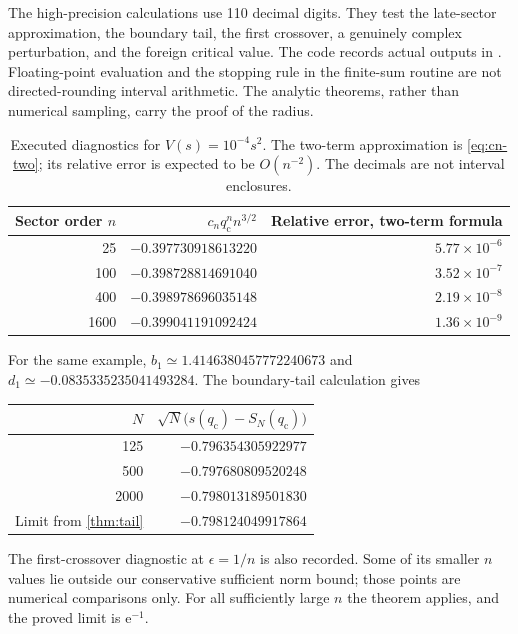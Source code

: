 \documentclass[11pt,a4paper]{article}
\numberwithin{equation}{section}
\theoremstyle{definition}
\theoremstyle{remark}
\newcommand{\e}{\mathrm e}
\newcommand{\qcv}{q_{\mathrm c}}
\begin{document}
The high-precision calculations use 110 decimal digits. They test the late-sector approximation, the boundary tail, the first crossover, a genuinely complex perturbation, and the foreign critical value. The code records actual outputs in . Floating-point evaluation and the stopping rule in the finite-sum routine are not directed-rounding interval arithmetic. The analytic theorems, rather than numerical sampling, carry the proof of the radius.

\begin{table}[htbp]
\centering\small
\begin{tabular}{r rr}
\toprule
Sector order $n$ & $c_n\qcv^n n^{3/2}$ & Relative error, two-term formula\\
\midrule
25   & $-0.397730918613220$ & $5.77\times10^{-6}$\\
100  & $-0.398728814691040$ & $3.52\times10^{-7}$\\
400  & $-0.398978696035148$ & $2.19\times10^{-8}$\\
1600 & $-0.399041191092424$ & $1.36\times10^{-9}$\\
\bottomrule
\end{tabular}
\caption{Executed diagnostics for $V(s)=10^{-4}s^2$. The two-term approximation is \eqref{eq:cn-two}; its relative error is expected to be $O(n^{-2})$. The decimals are not interval enclosures.}
\label{tab:late}
\end{table}

For the same example, $b_1\simeq1.4146380457772240673$ and $d_1\simeq-0.0835335235041493284$. The boundary-tail calculation gives
\begin{center}
\small
\begin{tabular}{r r}
\toprule
$N$ & $\sqrt N\bigl(s(\qcv)-S_N(\qcv)\bigr)$\\
\midrule
125 & $-0.796354305922977$\\
500 & $-0.797680809520248$\\
2000 & $-0.798013189501830$\\
Limit from \cref{thm:tail} & $-0.798124049917864$\\
\bottomrule
\end{tabular}
\end{center}
The first-crossover diagnostic at $\epsilon=1/n$ is also recorded. Some of its smaller $n$ values lie outside our conservative sufficient norm bound; those points are numerical comparisons only. For all sufficiently large $n$ the theorem applies, and the proved limit is $\e^{-1}$.
\end{document}

